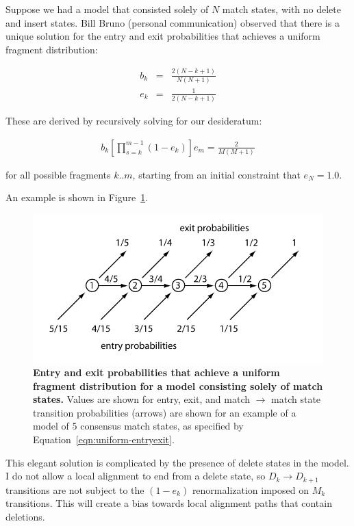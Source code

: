\documentclass[11pt]{article}
\begin{document}
Suppose we had a model that consisted solely of $N$ match states, with
no delete and insert states. Bill Bruno (personal communication)
observed that there is a unique solution for the entry and exit
probabilities that achieves a uniform fragment distribution:

\begin{eqnarray*}
   b_k & = & \frac{2(N-k+1)}{N(N+1)}\\
   e_k & = & \frac{1}{2(N-k+1)}
\label{eqn:uniform-entryexit}
\end{eqnarray*}

These are derived by recursively solving for our desideratum:

\begin{eqnarray*}
   b_k
   \left[\prod_{s=k}^{m-1} (1-e_k) \right]
   e_m
   = \frac{2}{M(M+1)}
\end{eqnarray*}

for all possible fragments $k..m$, starting from an initial constraint
that $e_N = 1.0$.

An example is shown in Figure~\ref{fig:entryexit-example}.

\begin{figure}
\begin{center}
\includegraphics[width=4.5in]{entryexit-example}
\end{center}
\caption{\textbf{Entry and exit probabilities that achieve a uniform
fragment distribution for a model consisting solely of match states.}
Values are shown for entry, exit, and match $\rightarrow$ match state
transition probabilities (arrows) are shown for an example of a model
of 5 consensus match states, as specified by
Equation~\ref{eqn:uniform-entryexit}.}
\label{fig:entryexit-example}
\end{figure}

This elegant solution is complicated by the presence of delete states
in the model. I do not allow a local alignment to end from a delete
state, so $D_k \rightarrow D_{k+1}$ transitions are not subject to the
$(1 - e_k)$ renormalization imposed on $M_k$ transitions. This will
create a bias towards local alignment paths that contain deletions.
\end{document}
